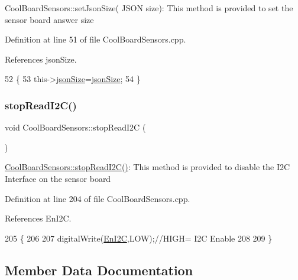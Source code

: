 Cool\+Board\+Sensors\+::set\+Json\+Size( J\+S\+O\+N size)\+: This method is provided to set the sensor board answer size 

Definition at line 51 of file Cool\+Board\+Sensors.\+cpp.



References json\+Size.


\begin{DoxyCode}
52 \{
53     this->\hyperlink{classCoolBoardSensors_a05a40dc80bfff14ffb830f549b876f8d}{jsonSize}=\hyperlink{classCoolBoardSensors_a05a40dc80bfff14ffb830f549b876f8d}{jsonSize};
54 \}
\end{DoxyCode}
\mbox{\label{classCoolBoardSensors_ab67b900b9e5e7c18d52d2d9107ba171b}} 
\subsubsection{\texorpdfstring{stop\+Read\+I2\+C()}{stopReadI2C()}}
{\footnotesize\ttfamily void Cool\+Board\+Sensors\+::stop\+Read\+I2C (\begin{DoxyParamCaption}{ }\end{DoxyParamCaption})}

\hyperlink{classCoolBoardSensors_ab67b900b9e5e7c18d52d2d9107ba171b}{Cool\+Board\+Sensors\+::stop\+Read\+I2\+C()}\+: This method is provided to disable the I2C Interface on the sensor board 

Definition at line 204 of file Cool\+Board\+Sensors.\+cpp.



References En\+I2C.


\begin{DoxyCode}
205 \{
206 
207     digitalWrite(\hyperlink{classCoolBoardSensors_aaa6b5dbf3a6633bffd9d204d961096dc}{EnI2C},LOW);\textcolor{comment}{//HIGH= I2C Enable}
208 
209 \}
\end{DoxyCode}


\subsection{Member Data Documentation}
\mbox{\label{classCoolBoardSensors_abff8dfeccb2f7689847bb64d5f1cd31e}} 
